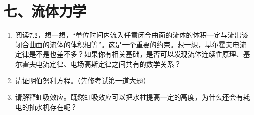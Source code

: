 \documentclass[12pt,a4paper]{article}
\begin{document}
\section{七、流体力学}
\begin{enumerate}[label=\arabic*.,leftmargin=*]
    \item 阅读7.2，想一想，“单位时间内流入任意闭合曲面的流体的体积一定与流出该闭合曲面的流体的体积相等”。这是一个重要的约束。想一想，基尔霍夫电流定律是不是也差不多？如果你有相关基础，是否可以发现流体连续性原理、基尔霍夫电流定律、电场高斯定律之间共有的数学关系？

    \item 请证明伯努利方程。（先修考试第一道大题）

    \item 请解释虹吸效应。既然虹吸效应可以把水柱提高一定的高度，为什么还会有耗电的抽水机存在呢？
\end{enumerate}
\end{document}
